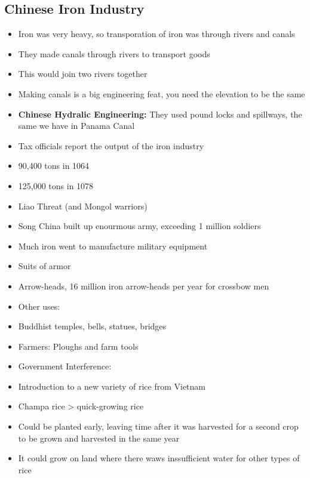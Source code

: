 \documentclass{article}
\begin{document}
\subsection{Chinese Iron Industry}
\begin{itemize}
  \item Iron was very heavy, so transporation of iron
    was through rivers and canals
  \item They made canals through rivers to transport goods
  \item This would join two rivers together
  \item Making canals is a big engineering feat,
    you need the elevation to be the same
  \item \textbf{Chinese Hydralic Engineering:} They used pound locks and spillways,
    the same we have in Panama Canal
  \item Tax officials report the output of the iron industry

  \item 90,400 tons in 1064
  \item 125,000 tons in 1078
  \item Liao Threat (and Mongol warriors)
  \item Song China built up enourmous army, exceeding 1 million soldiers
  \item Much iron went to manufacture military equipment
  \item Suits of armor
  \item Arrow-heads, 16 million iron arrow-heads per year for crossbow men
  \item Other uses:
  \item Buddhist temples, bells, statues, bridges
  \item Farmers: Ploughs and farm tools
  \item Government Interference:
  \item Introduction to a new variety of rice from Vietnam
  \item Champa rice > quick-growing rice
  \item Could be planted early, leaving time after it was harvested for a second crop
    to be grown and harvested in the same year
  \item It could grow on land where there waws inssufficient water for other types of rice
\end{itemize}
\end{document}
